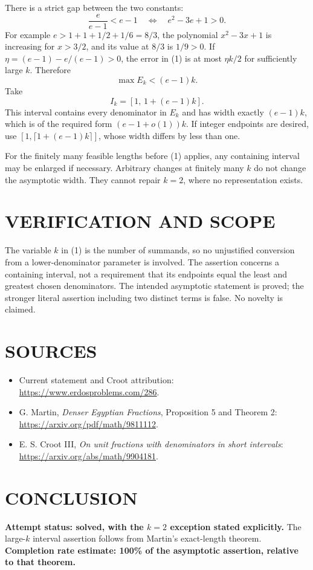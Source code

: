 There is a strict gap between the two constants:
\[
\frac e{e-1}<e-1
\quad\Longleftrightarrow\quad e^2-3e+1>0.
\tag{2}
\]
For example $e>1+1+1/2+1/6=8/3$, the polynomial $x^2-3x+1$ is increasing for $x>3/2$, and its value at $8/3$ is $1/9>0$. If $\eta=(e-1)-e/(e-1)>0$, the error in (1) is at most $\eta k/2$ for sufficiently large $k$. Therefore
\[
\max E_k<(e-1)k.
\]
Take
\[
I_k=[1,\,1+(e-1)k].
\tag{3}
\]
This interval contains every denominator in $E_k$ and has width exactly $(e-1)k$, which is of the required form $(e-1+o(1))k$. If integer endpoints are desired, use $[1,\lceil1+(e-1)k\rceil]$, whose width differs by less than one.

For the finitely many feasible lengths before (1) applies, any containing interval may be enlarged if necessary. Arbitrary changes at finitely many $k$ do not change the asymptotic width. They cannot repair $k=2$, where no representation exists.

\section{VERIFICATION AND SCOPE}
The variable $k$ in (1) is the number of summands, so no unjustified conversion from a lower-denominator parameter is involved. The assertion concerns a containing interval, not a requirement that its endpoints equal the least and greatest chosen denominators. The intended asymptotic statement is proved; the stronger literal assertion including two distinct terms is false. No novelty is claimed.

\section{SOURCES}
\begin{itemize}
\item Current statement and Croot attribution: \url{https://www.erdosproblems.com/286}.
\item G. Martin, \emph{Denser Egyptian Fractions}, Proposition 5 and Theorem 2: \url{https://arxiv.org/pdf/math/9811112}.
\item E. S. Croot III, \emph{On unit fractions with denominators in short intervals}: \url{https://arxiv.org/abs/math/9904181}.
\end{itemize}
\section{CONCLUSION}
\textbf{Attempt status: solved, with the $k=2$ exception stated explicitly.}
The large-$k$ interval assertion follows from Martin's exact-length theorem.
\textbf{Completion rate estimate: 100\% of the asymptotic assertion, relative to that theorem.}
